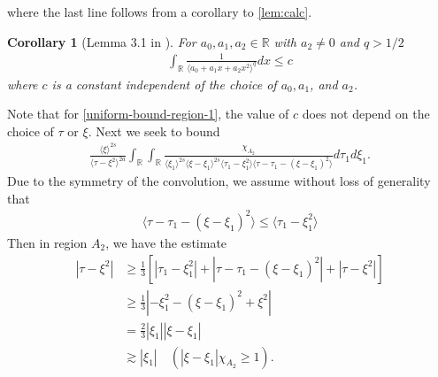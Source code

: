 \documentclass[12pt,reqno]{amsart}
\numberwithin{equation}{section}  %
\numberwithin{figure}{section}
\newcommand{\rr}{\mathbb{R}}
\theoremstyle{plain}
\newtheorem{corollary}{Corollary}
\theoremstyle{definition}
\theoremstyle{remark}
\begin{document}
%
%
where the last line follows from a corollary to \autoref{lem:calc}.
%
%
%
%
%
%
%
%
\begin{corollary}[Lemma 3.1 in \cite{Farah:2009uq}]
  For $a_{0}, a_{1}, a_{2} \in \rr$ with $a_{2} \neq 0$ and $q > 1/2$
  \begin{equation*}
  \begin{split}
    \int_{\rr} \frac{1}{\langle a_{0} + a_{1}x + a_{2}x^{2} \rangle ^{q}} dx \le c
  \end{split}
  \end{equation*}
  where $c$ is a constant independent of the choice of $a_{0}, a_{1}$, and $a_{2}$.
\label{cor:integral-bound}
\end{corollary}
Note that for \eqref{uniform-bound-region-1}, the
value of $c$ does not depend on the choice of $\tau$ or $\xi$. 
Next we seek to bound
\begin{equation}
  \label{case-1-region-2}
  \begin{split}
    \frac{ \langle \xi
    \rangle ^{2s}}{\langle \tau - \xi^{2} \rangle ^{2a}}
    \int_{\rr} \int_{\rr} \frac{\chi_{A_{2}}}{ \langle \xi_{1} \rangle ^{2s} \langle \xi-\xi_{1} \rangle ^{2s} 
    \langle \tau_{1} - \xi_{1}^{2} \rangle \langle  \tau - \tau_{1} -
    (\xi - \xi_{1})^{2} \rangle }
    d \tau_1 d \xi_{1}.
  \end{split}
\end{equation}
Due to the symmetry of the convolution, we assume without loss of generality that
%
%
\begin{equation*}
\begin{split}
  \langle \tau - \tau_{1} - (\xi - \xi_{1})^{2} \rangle \le \langle
  \tau_{1} - \xi_{1}^{2}\rangle 
\end{split}
\end{equation*}
%
%
Then in region $A_{2}$, we have the estimate
%
%
\begin{equation}
\begin{split}
  | \tau - \xi^{2} |
  & \ge \frac{1}{3}\left[ | \tau_{1} - \xi_{1}^{2} | + | \tau -
  \tau_{1} - (\xi - \xi_{1})^{2}
  | + | \tau - \xi^{2} | \right]
  \\
  & \ge \frac{1}{3} | - \xi_{1}^{2} - (\xi - \xi_{1})^{2} + \xi^{2} |
  \\
  & = \frac{2}{3} | \xi_{1} | | \xi - \xi_{1} |
  \\
  & \gtrsim | \xi_{1} | \quad (| \xi - \xi_{1} |\chi_{A_{2}} \ge 1).
\end{split}
\label{region-2-smoothing}
\end{equation}
\end{document}
